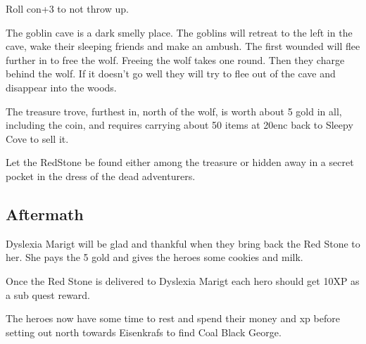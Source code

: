 \documentclass[11pt, twoside, titlepage, a4paper]{report}
\begin{document}
Roll con+3 to not throw up.

The goblin cave is a dark smelly place.
The goblins will retreat to the left in the cave, wake their sleeping friends and make an ambush. The first wounded will flee further in to free the wolf. Freeing the wolf takes one round. Then they charge behind the wolf. If it doesn't go well they will try to flee out of the cave and disappear into the woods.

The treasure trove, furthest in, north of the wolf, is worth about 5 gold in all, including the coin, and requires carrying about 50 items at 20enc back to Sleepy Cove to sell it.

Let the RedStone be found either among the treasure or hidden away in a secret pocket in the dress of the dead adventurers.


\subsection*{Aftermath}
Dyslexia Marigt will be glad and thankful when they bring back the Red Stone to her. She pays the 5 gold and gives the heroes some cookies and milk.

Once the Red Stone is delivered to Dyslexia Marigt each hero should get 10XP as a sub quest reward.

The heroes now have some time to rest and spend their money and xp before setting out north towards Eisenkrafs to find Coal Black George.
\end{document}
